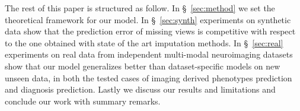 The rest of this paper is structured as follow.
In \S~\ref{sec:method} we set the theoretical framework for our model.
In \S~\ref{sec:synth} experiments on synthetic data show that the prediction error of missing views is competitive with respect to the one obtained with state of the art imputation methods.
In \S~\ref{sec:real} experiments on real data from independent multi-modal neuroimaging datasets show that our model generalizes better than dataset-specific models on new unseen data, in both the tested cases of imaging derived phenotypes prediction and diagnosis prediction.
Lastly we discuss our results and limitations and conclude our work with summary remarks.
